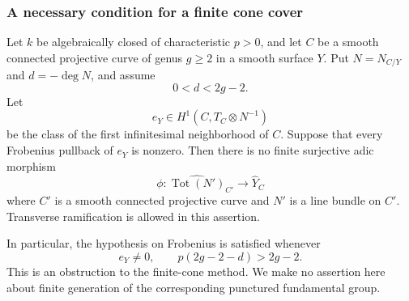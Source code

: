 \subsubsection{A necessary condition for a finite cone cover}

\begin{proposition}
\label{D:persistent-first-neighborhood}
Let $k$ be algebraically closed of characteristic $p>0$, and let
$C$ be a smooth connected projective curve of genus $g\geq2$ in a smooth
surface $Y$.  Put $N=N_{C/Y}$ and $d=-\deg N$, and assume
\[
                         0<d<2g-2.
\]
Let
\[
 e_Y\in H^1(C,T_C\otimes N^{-1})
\]
be the class of the first infinitesimal neighborhood of $C$.
Suppose that every Frobenius pullback of $e_Y$ is nonzero.
Then there is no finite surjective adic morphism
\[
 \phi:\widehat{\operatorname{Tot}(N')}_{C'}
             \longrightarrow\widehat Y_C
\]
where $C'$ is a smooth connected projective curve and $N'$ is a line
bundle on $C'$.  Transverse ramification is allowed in this assertion.

In particular, the hypothesis on Frobenius is satisfied whenever
\[
                   e_Y\ne0,\qquad p(2g-2-d)>2g-2.
\]
This is an obstruction to the finite-cone method.  We make no assertion
here about finite generation of the corresponding punctured fundamental
group.
\end{proposition}

